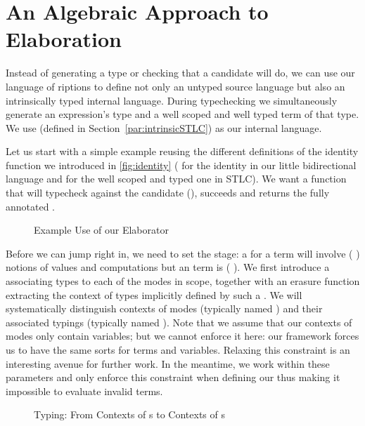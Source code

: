 \section{An Algebraic Approach to Elaboration}\label{section:elaboration}

Instead of generating a type or checking that a candidate will do, we
can use our language of riptions to define not only an
untyped source language but also an intrinsically typed internal
language. During typechecking we simultaneously generate an
expression's type and a well scoped and well typed term of that
type. We use  (defined in Section~\ref{par:intrinsicSTLC}) as
our internal language.

Let us start with a simple example reusing the different definitions of
the identity function we introduced in \cref{fig:identity}
( for the identity in our little bidirectional
language and  for the well scoped and typed one
in STLC). We want a function that will typecheck 
against the candidate (), succeeds and returns the
fully annotated .

\begin{figure}[h]
\caption{Example Use of our Elaborator}
\end{figure}

Before we can jump right in, we need to set the stage: a  for
a  term will involve ({ }) notions of values
and computations but an  term is ({ }).
%
We first introduce a  associating types to each of the modes in
scope, together with an erasure function  extracting the context
of types implicitly defined by such a .
%
We will systematically distinguish contexts of modes (typically named )
and their associated typings (typically named ). Note that we assume
that our contexts of modes only contain  variables; but we cannot
enforce it here: our framework forces us to have the same sorts for terms
and variables. Relaxing this constraint is an interesting avenue for further
work. In the meantime, we work within these parameters and only enforce this
constraint when defining our  thus making it impossible to
evaluate invalid terms.

\begin{figure}[h]
\begin{minipage}[t]{0.4\textwidth}
\end{minipage}
\begin{minipage}[t]{0.5\textwidth}
\end{minipage}
\caption{Typing: From Contexts of s to Contexts of s\label{fig:typingmodes}}
\end{figure}

